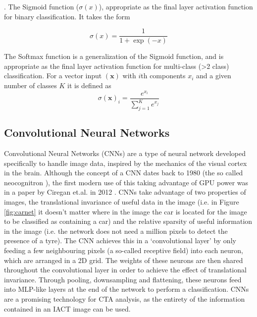 \cite{Keras}. The Sigmoid function ($\sigma(x)$), appropriate as the final layer activation function for binary classification. It takes the form

\begin{equation}
    \sigma(x)=\frac{1}{1+\exp(-x)}
\end{equation}

The Softmax function is a generalization of the Sigmoid function, and is appropriate as the final layer activation function for multi-class (>2 class) classification. For a vector input $(\textbf{x})$ with $i$th components $x_i $ and a given number of classes $K$ it is defined as
\begin{equation}
    \sigma(\textbf{x})_i=\frac{e^{x_i}}{\sum_{j=1}^K e^{x_j}}
\end{equation}


\subsection{Convolutional Neural Networks}
Convolutional Neural Networks (CNNs) are a type of neural network developed specifically to handle image data, inspired by the mechanics of the visual cortex in the brain. Although the concept of a CNN dates back to 1980 (the so called neocognitron \cite{neocongnitron}), the first modern use of this taking advantage of GPU power was in a paper by Ciregan et.al. in 2012 \cite{ciregan}. CNNs take advantage of two properties of images, the translational invariance of useful data in the image (i.e. in Figure \ref{fig:carnet} it doesn't matter where in the image the car is located for the image to be classified as containing a car) and the relative sparsity of useful information in the image (i.e. the network does not need a million pixels to detect the presence of a tyre). The CNN achieves this in a `convolutional layer' by only feeding a few neighbouring pixels (a so-called receptive field) into each neuron, which are arranged in a 2D grid. The weights of these neurons are then shared throughout the convolutional layer in order to achieve the effect of translational invariance. Through pooling, downsampling and flattening, 
these neurons feed into MLP-like layers at the end of the network to perform a classification. CNNs are a promising technology for CTA analysis, as the entirety of the information contained in an IACT image can be used.

